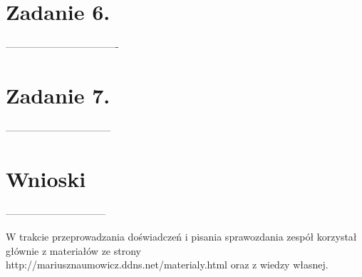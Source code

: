 \documentclass[polish,a4paper]{article}
\begin{document}
\section{Zadanie 6.}
----------------------------------

\section{Zadanie 7.}
--------------------------------

\section{Wnioski}
------------------------------





\begin{thebibliography}{9}

  W trakcie przeprowadzania doświadczeń i pisania sprawozdania zespół korzystał głównie z materiałów ze strony http://mariusznaumowicz.ddns.net/materialy.html oraz z wiedzy własnej.

\end{thebibliography}
\end{document}
